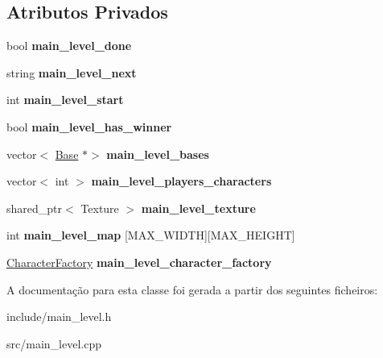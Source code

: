 \subsection*{Atributos Privados}
\begin{DoxyCompactItemize}
\item 
\mbox{\label{classMainLevel_ac73ac0af37dc694036a7da248d70ba75}} 
bool {\bfseries main\+\_\+level\+\_\+done}
\item 
\mbox{\label{classMainLevel_aa17ebbec1a36f9001ce5d8a9e282bbcf}} 
string {\bfseries main\+\_\+level\+\_\+next}
\item 
\mbox{\label{classMainLevel_a65bd52645923038402ab92b25af97b59}} 
int {\bfseries main\+\_\+level\+\_\+start}
\item 
\mbox{\label{classMainLevel_a6322c1a74e91e0b54dfa8368602963ad}} 
bool {\bfseries main\+\_\+level\+\_\+has\+\_\+winner}
\item 
\mbox{\label{classMainLevel_a8095418f188c09501ada69571a131594}} 
vector$<$ \mbox{\hyperlink{classBase}{Base}} $\ast$$>$ {\bfseries main\+\_\+level\+\_\+bases}
\item 
\mbox{\label{classMainLevel_a19560b2041a11b7780e5921b52dd7bb6}} 
vector$<$ int $>$ {\bfseries main\+\_\+level\+\_\+players\+\_\+characters}
\item 
\mbox{\label{classMainLevel_acf7f81373b053b58b0755934e5ec75b9}} 
shared\+\_\+ptr$<$ Texture $>$ {\bfseries main\+\_\+level\+\_\+texture}
\item 
\mbox{\label{classMainLevel_a67fb31550c22320459d70d1d8834238f}} 
int {\bfseries main\+\_\+level\+\_\+map} \mbox{[}M\+A\+X\+\_\+\+W\+I\+D\+TH\mbox{]}\mbox{[}M\+A\+X\+\_\+\+H\+E\+I\+G\+HT\mbox{]}
\item 
\mbox{\label{classMainLevel_a017084aa4aa83cfd18195025a6b5a703}} 
\mbox{\hyperlink{classCharacterFactory}{Character\+Factory}} {\bfseries main\+\_\+level\+\_\+character\+\_\+factory}
\end{DoxyCompactItemize}


A documentação para esta classe foi gerada a partir dos seguintes ficheiros\+:\begin{DoxyCompactItemize}
\item 
include/main\+\_\+level.\+h\item 
src/main\+\_\+level.\+cpp\end{DoxyCompactItemize}
